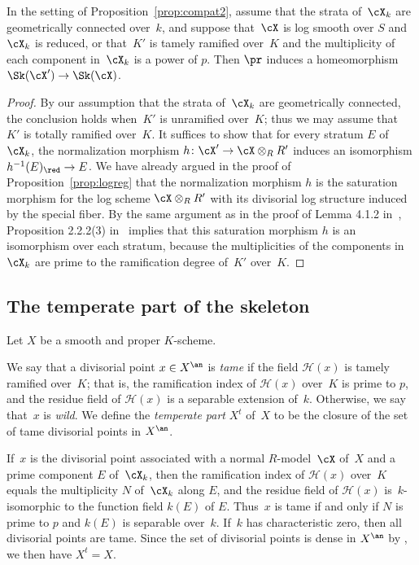 \begin{prop}\label{prop:compat5}
In the setting of Proposition~\ref{prop:compat2}, assume that the strata of~$\cX_k$ are geometrically connected over~$k$, and suppose that~$\cX$ is log smooth over $S$ and~$\cX_k$ is reduced, or that~$K'$ is tamely ramified over~$K$ and the multiplicity of each component in~$\cX_k$ is a power of $p$. Then $\pr$ induces a homeomorphism $\Sk(\cX')\to \Sk(\cX)$.
\end{prop}
\begin{proof}
By our assumption that the strata of~$\cX_k$ are geometrically connected, the conclusion holds when~$K'$ is unramified over~$K$; thus we may assume that~$K'$ is totally ramified over~$K$.
It suffices to show that for every stratum $E$ of
$\cX_k$,
the normalization morphism $h\colon \cX'\to \cX\otimes_R R'$ induces an isomorphism $h^{-1}(E)_{\red}\to E$.
We have already argued in the proof of Proposition~\ref{prop:logreg} that the normalization morphism $h$ is the saturation morphism for the log scheme $\cX\otimes_R R'$ with its divisorial log structure induced by the special fiber.
By the same argument as in the proof of Lemma 4.1.2 in~\cite{logzeta}, Proposition 2.2.2(3) in~\cite{logzeta} implies that this saturation morphism $h$ is an isomorphism over each stratum, because the multiplicities of the components in~$\cX_k$ are prime to the ramification degree of~$K'$ over~$K$.
\end{proof}

\subsection{The temperate part of the skeleton}\label{ss:tamepart}
Let $X$ be a smooth and proper $K$\nobreakdash-scheme.
\begin{definition}
We say that a divisorial point $x\in X^{\an}$ is {\em tame} if the field
$\mathscr{H}(x)$ is tamely ramified over~$K$; that is, the ramification index of $\mathscr{H}(x)$ over~$K$ is prime to $p$, and the residue field of $\mathscr{H}(x)$ is a separable extension of~$k$.
Otherwise, we say that~$x$ is {\em wild}.
We define the {\em temperate part} $X^t$ of~$X$ to be the closure of the set of tame divisorial points in $X^{\an}$.
\end{definition}

If~$x$ is the divisorial point associated with a normal $R$\nobreakdash-model~$\cX$ of~$X$ and a prime component $E$ of~$\cX_k$, then the ramification index of $\mathscr{H}(x)$ over~$K$ equals the multiplicity $N$ of~$\cX_k$ along $E$, and the residue field of
$\mathscr{H}(x)$ is~$k$-isomorphic to the function field $k(E)$ of $E$. Thus~$x$ is tame if and only if $N$ is prime to $p$ and $k(E)$ is separable over~$k$.
If~$k$ has characteristic zero, then all divisorial points are tame. Since the set of divisorial points is dense in $X^{\an}$ by \cite[2.4.9]{MuNi}, we then have $X^t=X$.

